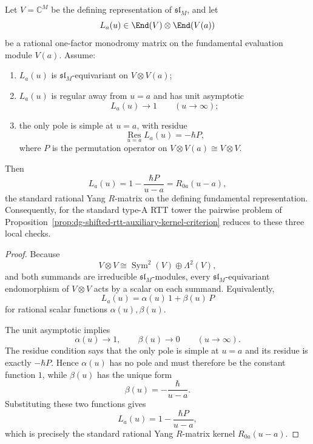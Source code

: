 \begin{proposition}
\label{prop:dg-shifted-rtt-typea-auxiliary-uniqueness}
Let $V=\mathbb{C}^M$ be the defining representation of
$\mathfrak{sl}_M$, and let
\[
L_a(u)\in \End(V)\otimes\End(V(a))
\]
be a rational one-factor monodromy matrix on the fundamental
evaluation module $V(a)$. Assume:
\begin{enumerate}[label=\textup{(\roman*)}]
\item $L_a(u)$ is $\mathfrak{sl}_M$-equivariant on
 $V\otimes V(a)$;
\item $L_a(u)$ is regular away from $u=a$ and has unit asymptotic
 \[
 L_a(u)\to 1
 \qquad (u\to\infty);
 \]
\item the only pole is simple at $u=a$, with residue
 \[
 \operatorname*{Res}_{u=a}L_a(u)=-\hbar P,
 \]
 where $P$ is the permutation operator on
 $V\otimes V(a)\cong V\otimes V$.
\end{enumerate}
Then
\[
L_a(u)=1-\frac{\hbar P}{u-a}=R_{0a}(u-a),
\]
the standard rational Yang $R$-matrix on the defining fundamental
representation. Consequently, for the standard type-A RTT tower the
pairwise problem of
Proposition~\ref{prop:dg-shifted-rtt-auxiliary-kernel-criterion}
reduces to these three local checks.
\end{proposition}

\begin{proof}
Because
\[
V\otimes V \cong \operatorname{Sym}^2(V)\oplus \Lambda^2(V),
\]
and both summands are irreducible $\mathfrak{sl}_M$-modules, every
$\mathfrak{sl}_M$-equivariant endomorphism of $V\otimes V$ acts by a
scalar on each summand. Equivalently,
\[
L_a(u)=\alpha(u)\,1+\beta(u)\,P
\]
for rational scalar functions $\alpha(u),\beta(u)$.

The unit asymptotic implies
\[
\alpha(u)\to 1,\qquad \beta(u)\to 0
\qquad (u\to\infty).
\]
The residue condition says that the only pole is simple at $u=a$ and
its residue is exactly $-\hbar P$. Hence $\alpha(u)$ has no pole and
must therefore be the constant function $1$, while $\beta(u)$ has the
unique form
\[
\beta(u)=-\frac{\hbar}{u-a}.
\]
Substituting these two functions gives
\[
L_a(u)=1-\frac{\hbar P}{u-a},
\]
which is precisely the standard rational Yang $R$-matrix kernel
$R_{0a}(u-a)$.
\end{proof}


